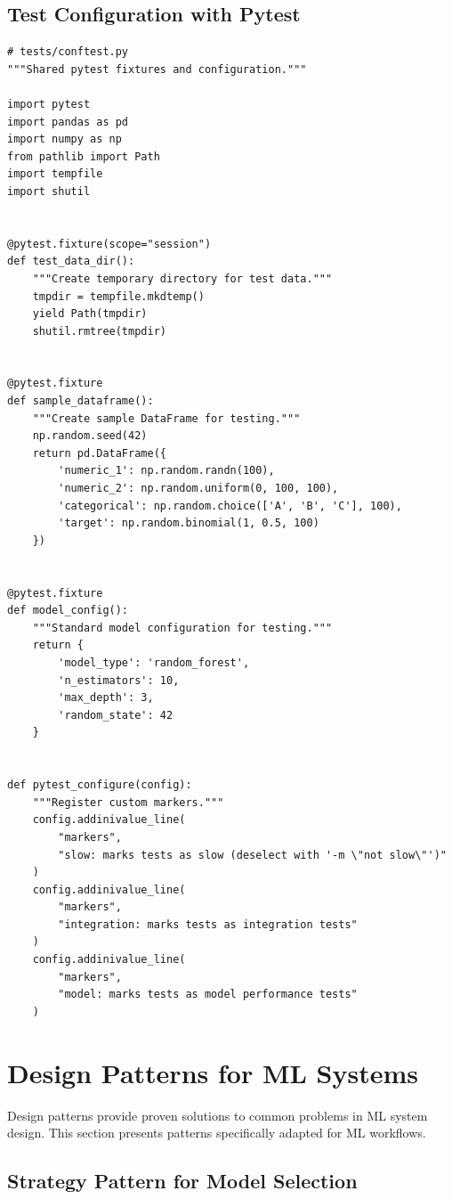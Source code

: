 \subsection{Test Configuration with Pytest}

\begin{lstlisting}[style=python, caption=Pytest configuration and fixtures]
# tests/conftest.py
"""Shared pytest fixtures and configuration."""

import pytest
import pandas as pd
import numpy as np
from pathlib import Path
import tempfile
import shutil


@pytest.fixture(scope="session")
def test_data_dir():
    """Create temporary directory for test data."""
    tmpdir = tempfile.mkdtemp()
    yield Path(tmpdir)
    shutil.rmtree(tmpdir)


@pytest.fixture
def sample_dataframe():
    """Create sample DataFrame for testing."""
    np.random.seed(42)
    return pd.DataFrame({
        'numeric_1': np.random.randn(100),
        'numeric_2': np.random.uniform(0, 100, 100),
        'categorical': np.random.choice(['A', 'B', 'C'], 100),
        'target': np.random.binomial(1, 0.5, 100)
    })


@pytest.fixture
def model_config():
    """Standard model configuration for testing."""
    return {
        'model_type': 'random_forest',
        'n_estimators': 10,
        'max_depth': 3,
        'random_state': 42
    }


def pytest_configure(config):
    """Register custom markers."""
    config.addinivalue_line(
        "markers",
        "slow: marks tests as slow (deselect with '-m \"not slow\"')"
    )
    config.addinivalue_line(
        "markers",
        "integration: marks tests as integration tests"
    )
    config.addinivalue_line(
        "markers",
        "model: marks tests as model performance tests"
    )
\end{lstlisting}

\section{Design Patterns for ML Systems}

Design patterns provide proven solutions to common problems in ML system design. This section presents patterns specifically adapted for ML workflows.

\subsection{Strategy Pattern for Model Selection}

